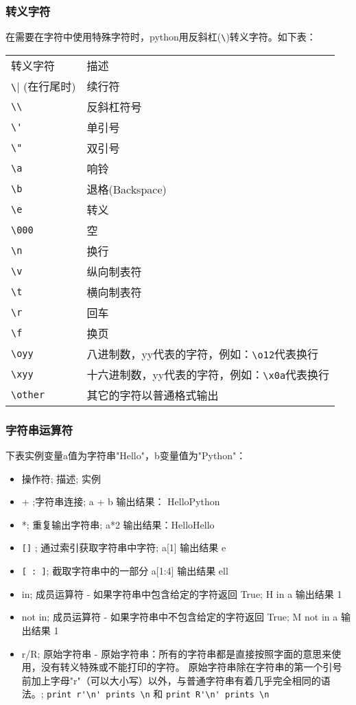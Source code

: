 \subsubsection{转义字符}
在需要在字符中使用特殊字符时，python用反斜杠(\verb|\|)转义字符。如下表：

\begin{tabular}{l|l}
转义字符&	描述\\
\verb|\| (在行尾时)&	续行符\\
\verb|\\|	&反斜杠符号\\
\verb|\'|	&单引号\\
\verb|\"|	&双引号\\
\verb|\a|	&响铃\\
\verb|\b|	&退格(Backspace)\\
\verb|\e|	&转义\\
\verb|\000|	&空\\
\verb|\n|	&换行\\
\verb|\v|	&纵向制表符\\
\verb|\t|	&横向制表符\\
\verb|\r|	&回车\\
\verb|\f|	&换页\\
\verb|\oyy|	&八进制数，yy代表的字符，例如：\verb|\o12|代表换行\\
\verb|\xyy|	&十六进制数，yy代表的字符，例如：\verb|\x0a|代表换行\\
\verb|\other|	&其它的字符以普通格式输出
\end{tabular}


\subsubsection{字符串运算符}
下表实例变量a值为字符串"Hello"，b变量值为"Python"：

\begin{itemize}
\item 操作符;	描述;	实例
\item +	;字符串连接;	a + b 输出结果： HelloPython
\item *;	重复输出字符串;	a*2 输出结果：HelloHello
\item \verb|[]|	; 通过索引获取字符串中字符;	a[1] 输出结果 e
\item \verb|[ : ]|; 	截取字符串中的一部分	a[1:4] 输出结果 ell
\item in;	成员运算符 - 如果字符串中包含给定的字符返回 True;	H in a 输出结果 1
\item not in;	成员运算符 - 如果字符串中不包含给定的字符返回 True;	M not in a 输出结果 1
\item r/R;	原始字符串 - 原始字符串：所有的字符串都是直接按照字面的意思来使用，没有转义特殊或不能打印的字符。 原始字符串除在字符串的第一个引号前加上字母"r"（可以大小写）以外，与普通字符串有着几乎完全相同的语法。;	\verb|print r'\n' prints \n| 和 \verb|print R'\n' prints \n|
\end{itemize}



